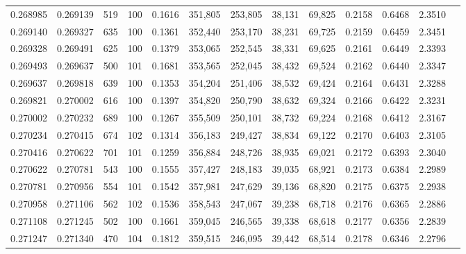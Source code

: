 \begin{tabular}{rrrrrrrrrrrrr}
0.268985 & 0.269139 &   519 & 100 &                                     0.1616 & 351,805 & 253,805 &  38,131 &  69,825 & 0.2158 & 0.6468 & 2.3510 \\
0.269140 & 0.269327 &   635 & 100 &                                     0.1361 & 352,440 & 253,170 &  38,231 &  69,725 & 0.2159 & 0.6459 & 2.3451 \\
0.269328 & 0.269491 &   625 & 100 &                                     0.1379 & 353,065 & 252,545 &  38,331 &  69,625 & 0.2161 & 0.6449 & 2.3393 \\
0.269493 & 0.269637 &   500 & 101 &                                     0.1681 & 353,565 & 252,045 &  38,432 &  69,524 & 0.2162 & 0.6440 & 2.3347 \\
0.269637 & 0.269818 &   639 & 100 &                                     0.1353 & 354,204 & 251,406 &  38,532 &  69,424 & 0.2164 & 0.6431 & 2.3288 \\
0.269821 & 0.270002 &   616 & 100 &                                     0.1397 & 354,820 & 250,790 &  38,632 &  69,324 & 0.2166 & 0.6422 & 2.3231 \\
0.270002 & 0.270232 &   689 & 100 &                                     0.1267 & 355,509 & 250,101 &  38,732 &  69,224 & 0.2168 & 0.6412 & 2.3167 \\
0.270234 & 0.270415 &   674 & 102 &                                     0.1314 & 356,183 & 249,427 &  38,834 &  69,122 & 0.2170 & 0.6403 & 2.3105 \\
0.270416 & 0.270622 &   701 & 101 &                                     0.1259 & 356,884 & 248,726 &  38,935 &  69,021 & 0.2172 & 0.6393 & 2.3040 \\
0.270622 & 0.270781 &   543 & 100 &                                     0.1555 & 357,427 & 248,183 &  39,035 &  68,921 & 0.2173 & 0.6384 & 2.2989 \\
0.270781 & 0.270956 &   554 & 101 &                                     0.1542 & 357,981 & 247,629 &  39,136 &  68,820 & 0.2175 & 0.6375 & 2.2938 \\
0.270958 & 0.271106 &   562 & 102 &                                     0.1536 & 358,543 & 247,067 &  39,238 &  68,718 & 0.2176 & 0.6365 & 2.2886 \\
0.271108 & 0.271245 &   502 & 100 &                                     0.1661 & 359,045 & 246,565 &  39,338 &  68,618 & 0.2177 & 0.6356 & 2.2839 \\
0.271247 & 0.271340 &   470 & 104 &                                     0.1812 & 359,515 & 246,095 &  39,442 &  68,514 & 0.2178 & 0.6346 & 2.2796 \\

\end{tabular}
